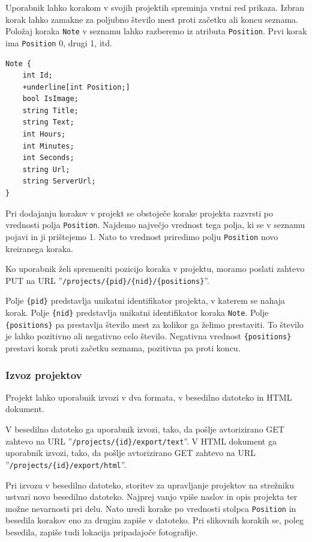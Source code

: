 \documentclass[a4paper, 12pt]{book}
\begin{document}
Uporabnik lahko korakom v svojih projektih spreminja vrstni red prikaza.
Izbran korak lahko zamakne za poljubno število mest proti začetku ali koncu seznama.
Položaj koraka \texttt{Note} v seznamu lahko razberemo iz atributa \texttt{Position}.
Prvi korak ima \texttt{Position} 0, drugi 1, itd.

\begin{Verbatim}[commandchars=+\[\]]
Note { 
    int Id; 
    +underline[int Position;]
    bool IsImage;  
    string Title; 
    string Text;
    int Hours; 
    int Minutes;
    int Seconds;
    string Url;
    string ServerUrl;
}
\end{Verbatim}

Pri dodajanju korakov v projekt se obstoječe korake projekta razvrsti po vrednosti polja \texttt{Position}.
Najdemo največjo vrednost tega polja, ki se v seznamu pojavi in ji prištejemo 1.
Nato to vrednost priredimo polju \texttt{Position} novo kreiranega koraka.

Ko uporabnik želi spremeniti pozicijo koraka v projektu, moramo poslati zahtevo PUT na URL ''\texttt{/projects/\{pid\}/\{nid\}/\{positions\}}''.

Polje \texttt{\{pid\}} predstavlja unikatni identifikator projekta, v katerem se nahaja korak.
Polje \texttt{\{nid\}} predstavlja unikatni identifikator koraka \texttt{Note}.
Polje \texttt{\{positions\}} pa prestavlja število mest za kolikor ga želimo prestaviti.
To število je lahko pozitivno ali negativno celo število.
Negativna vrednost \texttt{\{positions\}} prestavi korak proti začetku seznama, pozitivna pa proti koncu.

\subsubsection{Izvoz projektov}

Projekt lahko uporabnik izvozi v dva formata, v besedilno datoteko in HTML dokument.

V besedilno datoteko ga uporabnik izvozi, tako, da pošlje avtorizirano GET zahtevo na URL ''\texttt{/projects/\{id\}/export/text}''.
V HTML dokument ga uporabnik izvozi, tako, da pošlje avtorizirano GET zahtevo na URL ''\texttt{/projects/\{id\}/export/html}''.

Pri izvozu v besedilno datoteko, storitev za upravljanje projektov na strežniku ustvari novo besedilno datoteko.
Najprej vanjo vpiše naslov in opis projekta ter možne nevarnosti pri delu.
Nato uredi korake po vrednosti stolpca \texttt{Position} in besedila korakov eno za drugim zapiše v datoteko.
Pri slikovnih korakih se, poleg besedila, zapiše tudi lokacija pripadajoče fotografije.
\end{document}
